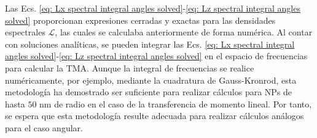 Las Ecs. \eqref{eq: Lx spectral integral angles solved}-\eqref{eq: Lz spectral integral angles solved} proporcionan expresiones cerradas y exactas para las densidades espectrales $\mathcal{L}$, las cuales se calculaba anteriormente de forma numérica. Al contar con soluciones analíticas, se pueden integrar las Ecs. \eqref{eq: Lx spectral integral angles solved}-\eqref{eq: Lz spectral integral angles solved} en el espacio de frecuencias para calcular la TMA. Aunque la integral de frecuencias se realice numéricamente, por ejemplo, mediante la cuadratura de Gauss-Kronrod, esta metodología ha demostrado ser suficiente para realizar cálculos para NPs de hasta $50$ nm de radio en el caso de la transferencia de momento lineal. Por tanto, se espera que esta metodología resulte adecuada para realizar cálculos análogos para el caso angular.